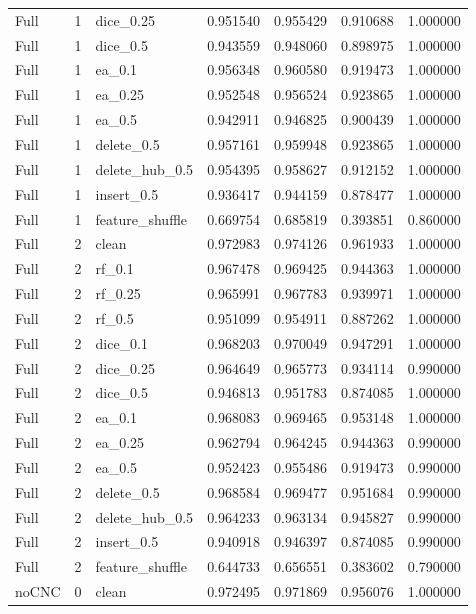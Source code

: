 \documentclass[UTF8,a4paper,11pt,fontset=fandol]{ctexart}
\begin{document}
{\begin{longtable}{lrlrrrr}
Full & 1 & dice\_0.25 & 0.951540 & 0.955429 & 0.910688 & 1.000000 \\
Full & 1 & dice\_0.5 & 0.943559 & 0.948060 & 0.898975 & 1.000000 \\
Full & 1 & ea\_0.1 & 0.956348 & 0.960580 & 0.919473 & 1.000000 \\
Full & 1 & ea\_0.25 & 0.952548 & 0.956524 & 0.923865 & 1.000000 \\
Full & 1 & ea\_0.5 & 0.942911 & 0.946825 & 0.900439 & 1.000000 \\
Full & 1 & delete\_0.5 & 0.957161 & 0.959948 & 0.923865 & 1.000000 \\
Full & 1 & delete\_hub\_0.5 & 0.954395 & 0.958627 & 0.912152 & 1.000000 \\
Full & 1 & insert\_0.5 & 0.936417 & 0.944159 & 0.878477 & 1.000000 \\
Full & 1 & feature\_shuffle & 0.669754 & 0.685819 & 0.393851 & 0.860000 \\
Full & 2 & clean & 0.972983 & 0.974126 & 0.961933 & 1.000000 \\
Full & 2 & rf\_0.1 & 0.967478 & 0.969425 & 0.944363 & 1.000000 \\
Full & 2 & rf\_0.25 & 0.965991 & 0.967783 & 0.939971 & 1.000000 \\
Full & 2 & rf\_0.5 & 0.951099 & 0.954911 & 0.887262 & 1.000000 \\
Full & 2 & dice\_0.1 & 0.968203 & 0.970049 & 0.947291 & 1.000000 \\
Full & 2 & dice\_0.25 & 0.964649 & 0.965773 & 0.934114 & 0.990000 \\
Full & 2 & dice\_0.5 & 0.946813 & 0.951783 & 0.874085 & 1.000000 \\
Full & 2 & ea\_0.1 & 0.968083 & 0.969465 & 0.953148 & 1.000000 \\
Full & 2 & ea\_0.25 & 0.962794 & 0.964245 & 0.944363 & 0.990000 \\
Full & 2 & ea\_0.5 & 0.952423 & 0.955486 & 0.919473 & 0.990000 \\
Full & 2 & delete\_0.5 & 0.968584 & 0.969477 & 0.951684 & 0.990000 \\
Full & 2 & delete\_hub\_0.5 & 0.964233 & 0.963134 & 0.945827 & 0.990000 \\
Full & 2 & insert\_0.5 & 0.940918 & 0.946397 & 0.874085 & 0.990000 \\
Full & 2 & feature\_shuffle & 0.644733 & 0.656551 & 0.383602 & 0.790000 \\
noCNC & 0 & clean & 0.972495 & 0.971869 & 0.956076 & 1.000000 \\

\end{longtable}}
\end{document}
